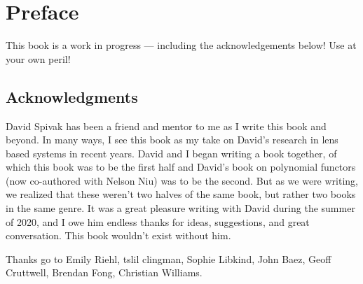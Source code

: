 \documentclass[DynamicalBook]{subfiles}
\begin{document}
%


\setcounter{chapter}{0}%


\chapter{Preface}\label{chapter.0}

This book is a work in progress --- including the acknowledgements below! Use at your own peril!

\section*{Acknowledgments}

David Spivak has been a friend and mentor to me as I write this book and beyond.
In many ways, I see this book as my take on David's research in lens based
systems in recent years. David and I began writing a book together, of which
this book was to be the first half and David's book on polynomial functors (now
co-authored with Nelson Niu) was to be the second. But as we were writing, we
realized that these weren't two halves of the same book, but rather two books
in the same genre. It was a great pleasure writing with David during the summer
of 2020, and I owe him endless thanks for ideas, suggestions, and great
conversation. This book wouldn't exist without him.



Thanks go to Emily Riehl, tslil clingman, Sophie Libkind, John Baez, Geoff Cruttwell, Brendan
Fong, Christian Williams.
\end{document}
